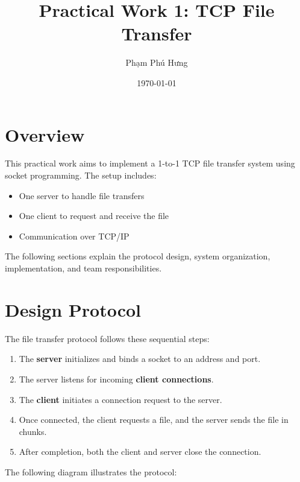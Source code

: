 \documentclass[a4paper,12pt]{article}
\title{Practical Work 1: TCP File Transfer}
\author{Phạm Phú Hưng}
\date{\today}
\begin{document}
\maketitle

\section*{Overview}
This practical work aims to implement a 1-to-1 TCP file transfer system using socket programming. The setup includes:
\begin{itemize}
    \item One server to handle file transfers
    \item One client to request and receive the file
    \item Communication over TCP/IP
\end{itemize}

The following sections explain the protocol design, system organization, implementation, and team responsibilities.

\section*{Design Protocol}
The file transfer protocol follows these sequential steps:
\begin{enumerate}
    \item The \textbf{server} initializes and binds a socket to an address and port.
    \item The server listens for incoming \textbf{client connections}.
    \item The \textbf{client} initiates a connection request to the server.
    \item Once connected, the client requests a file, and the server sends the file in chunks.
    \item After completion, both the client and server close the connection.
\end{enumerate}

The following diagram illustrates the protocol:
\end{document}

